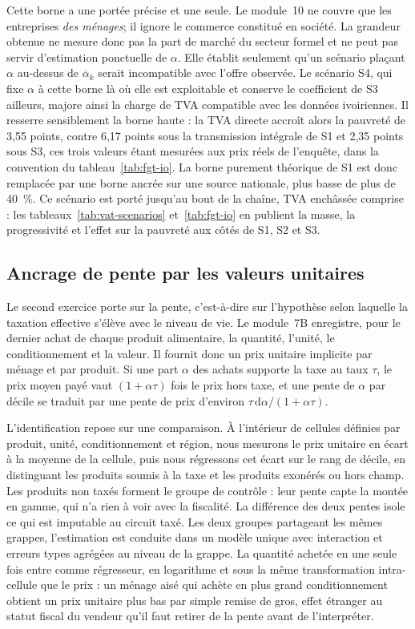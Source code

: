 \documentclass[11pt,a4paper]{article}
\begin{document}
Cette borne a une portée précise et une seule. Le module~10 ne couvre que les
entreprises \emph{des ménages}; il ignore le commerce constitué en société. La
grandeur obtenue ne mesure donc pas la part de marché du secteur formel et ne
peut pas servir d'estimation ponctuelle de $\alpha$. Elle établit seulement qu'un
scénario plaçant $\alpha$ au-dessus de $\overline{\alpha}_k$ serait incompatible
avec l'offre observée. Le scénario S4, qui fixe $\alpha$ à cette borne là où elle
est exploitable et conserve le coefficient de S3 ailleurs, majore ainsi la charge
de TVA compatible avec les données ivoiriennes. Il resserre sensiblement la borne
haute : la TVA directe accroît alors la pauvreté de 3,55 points, contre 6,17
points sous la transmission intégrale de S1 et 2,35 points sous S3, ces trois
valeurs étant mesurées aux prix réels de l'enquête, dans la convention du
tableau~\ref{tab:fgt-io}. La borne purement théorique de S1 est donc remplacée
par une borne ancrée sur une source nationale, plus basse de plus de 40~\%. Ce scénario est porté jusqu'au bout de
la chaîne, TVA enchâssée comprise : les tableaux~\ref{tab:vat-scenarios}
et~\ref{tab:fgt-io} en publient la masse, la progressivité et l'effet sur la
pauvreté aux côtés de S1, S2 et S3.

\subsection{Ancrage de pente par les valeurs unitaires}

Le second exercice porte sur la pente, c'est-à-dire sur l'hypothèse selon
laquelle la taxation effective s'élève avec le niveau de vie. Le module~7B
enregistre, pour le dernier achat de chaque produit alimentaire, la quantité,
l'unité, le conditionnement et la valeur. Il fournit donc un prix unitaire
implicite par ménage et par produit. Si une part $\alpha$ des achats supporte la
taxe au taux $\tau$, le prix moyen payé vaut $(1+\alpha\tau)$ fois le prix hors
taxe, et une pente de $\alpha$ par décile se traduit par une pente de prix
d'environ $\tau\,\mathrm{d}\alpha/(1+\alpha\tau)$.

L'identification repose sur une comparaison. À l'intérieur de cellules définies
par produit, unité, conditionnement et région, nous mesurons le prix unitaire en
écart à la moyenne de la cellule, puis nous régressons cet écart sur le rang de
décile, en distinguant les produits soumis à la taxe et les produits exonérés ou
hors champ. Les produits non taxés forment le groupe de contrôle : leur pente
capte la montée en gamme, qui n'a rien à voir avec la fiscalité. La différence
des deux pentes isole ce qui est imputable au circuit taxé. Les deux groupes
partageant les mêmes grappes, l'estimation est conduite dans un modèle unique
avec interaction et erreurs types agrégées au niveau de la grappe. La quantité
achetée en une seule fois entre comme régresseur, en logarithme et sous la même
transformation intra-cellule que le prix : un ménage aisé qui achète en plus
grand conditionnement obtient un prix unitaire plus bas par simple remise de
gros, effet étranger au statut fiscal du vendeur qu'il faut retirer de la pente
avant de l'interpréter.
\end{document}
